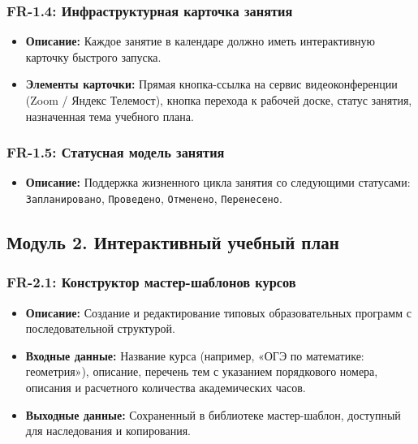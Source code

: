 \documentclass[12pt,a4paper]{article}
\begin{document}
\subsubsection*{FR-1.4: Инфраструктурная карточка занятия}
\begin{itemize}
    \item \textbf{Описание:} Каждое занятие в календаре должно иметь интерактивную карточку быстрого запуска.
    \item \textbf{Элементы карточки:} Прямая кнопка-ссылка на сервис видеоконференции (Zoom / Яндекс Телемост), кнопка перехода к рабочей доске, статус занятия, назначенная тема учебного плана.
\end{itemize}

\subsubsection*{FR-1.5: Статусная модель занятия}
\begin{itemize}
    \item \textbf{Описание:} Поддержка жизненного цикла занятия со следующими статусами: \texttt{Запланировано}, \texttt{Проведено}, \texttt{Отменено}, \texttt{Перенесено}.
\end{itemize}

\subsection{Модуль 2. Интерактивный учебный план}

\subsubsection*{FR-2.1: Конструктор мастер-шаблонов курсов}
\begin{itemize}
    \item \textbf{Описание:} Создание и редактирование типовых образовательных программ с последовательной структурой.
    \item \textbf{Входные данные:} Название курса (например, «ОГЭ по математике: геометрия»), описание, перечень тем с указанием порядкового номера, описания и расчетного количества академических часов.
    \item \textbf{Выходные данные:} Сохраненный в библиотеке мастер-шаблон, доступный для наследования и копирования.
\end{itemize}
\end{document}
